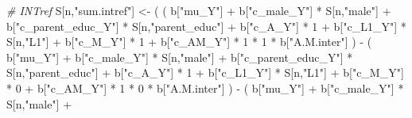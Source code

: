 \documentclass[
]{book}
\newenvironment{Shaded}{\begin{snugshade}}{\end{snugshade}}
\newcommand{\CommentTok}[1]{\textcolor[rgb]{0.56,0.35,0.01}{\textit{#1}}}
\newcommand{\DecValTok}[1]{\textcolor[rgb]{0.00,0.00,0.81}{#1}}
\newcommand{\NormalTok}[1]{#1}
\newcommand{\OtherTok}[1]{\textcolor[rgb]{0.56,0.35,0.01}{#1}}
\newcommand{\SpecialCharTok}[1]{\textcolor[rgb]{0.00,0.00,0.00}{#1}}
\newcommand{\StringTok}[1]{\textcolor[rgb]{0.31,0.60,0.02}{#1}}
\begin{document}
\begin{Shaded}
\begin{Highlighting}[]
    \CommentTok{\# INTref }
\NormalTok{    S[n,}\StringTok{"sum.intref"}\NormalTok{] }\OtherTok{\textless{}{-}}\NormalTok{ ( ( b[}\StringTok{"mu\_Y"}\NormalTok{] }\SpecialCharTok{+} 
\NormalTok{                               b[}\StringTok{"c\_male\_Y"}\NormalTok{] }\SpecialCharTok{*}\NormalTok{ S[n,}\StringTok{"male"}\NormalTok{] }\SpecialCharTok{+} 
\NormalTok{                               b[}\StringTok{"c\_parent\_educ\_Y"}\NormalTok{] }\SpecialCharTok{*}\NormalTok{ S[n,}\StringTok{"parent\_educ"}\NormalTok{] }\SpecialCharTok{+} 
\NormalTok{                               b[}\StringTok{"c\_A\_Y"}\NormalTok{] }\SpecialCharTok{*} \DecValTok{1} \SpecialCharTok{+} 
\NormalTok{                               b[}\StringTok{"c\_L1\_Y"}\NormalTok{] }\SpecialCharTok{*}\NormalTok{ S[n,}\StringTok{"L1"}\NormalTok{] }\SpecialCharTok{+}
\NormalTok{                               b[}\StringTok{"c\_M\_Y"}\NormalTok{] }\SpecialCharTok{*} \DecValTok{1} \SpecialCharTok{+}
\NormalTok{                               b[}\StringTok{"c\_AM\_Y"}\NormalTok{] }\SpecialCharTok{*} \DecValTok{1} \SpecialCharTok{*} \DecValTok{1} \SpecialCharTok{*}\NormalTok{ b[}\StringTok{"A.M.inter"}\NormalTok{] ) }\SpecialCharTok{{-}} 
\NormalTok{                             ( b[}\StringTok{"mu\_Y"}\NormalTok{] }\SpecialCharTok{+} 
\NormalTok{                                 b[}\StringTok{"c\_male\_Y"}\NormalTok{] }\SpecialCharTok{*}\NormalTok{ S[n,}\StringTok{"male"}\NormalTok{] }\SpecialCharTok{+} 
\NormalTok{                                 b[}\StringTok{"c\_parent\_educ\_Y"}\NormalTok{] }\SpecialCharTok{*}\NormalTok{ S[n,}\StringTok{"parent\_educ"}\NormalTok{] }\SpecialCharTok{+} 
\NormalTok{                                 b[}\StringTok{"c\_A\_Y"}\NormalTok{] }\SpecialCharTok{*} \DecValTok{1} \SpecialCharTok{+} 
\NormalTok{                                 b[}\StringTok{"c\_L1\_Y"}\NormalTok{] }\SpecialCharTok{*}\NormalTok{ S[n,}\StringTok{"L1"}\NormalTok{] }\SpecialCharTok{+}
\NormalTok{                                 b[}\StringTok{"c\_M\_Y"}\NormalTok{] }\SpecialCharTok{*} \DecValTok{0} \SpecialCharTok{+}
\NormalTok{                                 b[}\StringTok{"c\_AM\_Y"}\NormalTok{] }\SpecialCharTok{*} \DecValTok{1} \SpecialCharTok{*} \DecValTok{0} \SpecialCharTok{*}\NormalTok{ b[}\StringTok{"A.M.inter"}\NormalTok{] ) }\SpecialCharTok{{-}} 
\NormalTok{                             ( b[}\StringTok{"mu\_Y"}\NormalTok{] }\SpecialCharTok{+} 
\NormalTok{                                 b[}\StringTok{"c\_male\_Y"}\NormalTok{] }\SpecialCharTok{*}\NormalTok{ S[n,}\StringTok{"male"}\NormalTok{] }\SpecialCharTok{+} 

\end{Highlighting}
\end{Shaded}
\end{document}
